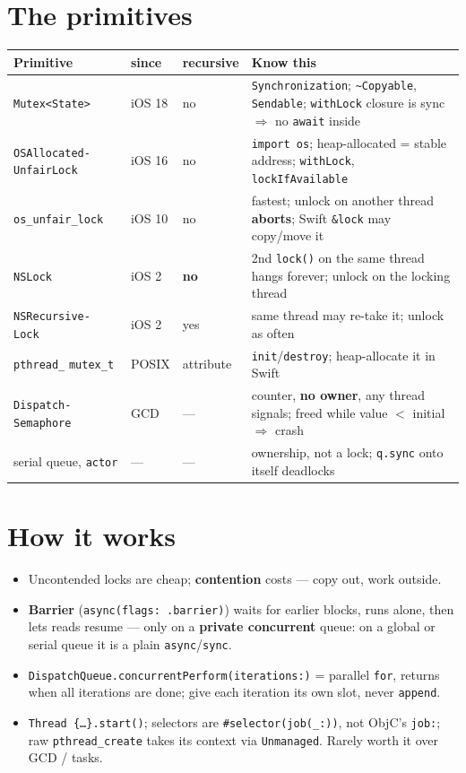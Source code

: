 \documentclass[8pt]{extarticle}
\newcommand\ct[1]{\texttt{#1}}
\begin{document}
\begin{multicols}{2}
\raggedright
\raggedcolumns

\section{The primitives}
{\scriptsize\setlength{\tabcolsep}{2pt}
\begin{tabular}{@{}L{16mm}L{7mm}L{10mm}L{42mm}@{}}
\toprule
\textbf{Primitive} & \textbf{since} & \textbf{recursive} & \textbf{Know this} \\ \midrule
\ct{Mutex<State>} & iOS 18 & no & \ct{Synchronization}; \ct{\textasciitilde Copyable}, \ct{Sendable}; \ct{withLock} closure is sync $\Rightarrow$ no \ct{await} inside \\
\ct{OSAllocated-} \ct{UnfairLock} & iOS 16 & no & \ct{import os}; heap-allocated = stable address; \ct{withLock}, \ct{lockIfAvailable} \\
\ct{os\_unfair\_lock} & iOS 10 & no & fastest; unlock on another thread \textbf{aborts}; Swift \ct{\&lock} may copy/move it \\
\ct{NSLock} & iOS 2 & \textbf{no} & 2nd \ct{lock()} on the same thread hangs forever; unlock on the locking thread \\
\ct{NSRecursive-} \ct{Lock} & iOS 2 & yes & same thread may re-take it; unlock as often \\
\ct{pthread\_} \ct{mutex\_t} & POSIX & attribute & \ct{init}/\ct{destroy}; heap-allocate it in Swift \\
\ct{Dispatch-} \ct{Semaphore} & GCD & — & counter, \textbf{no owner}, any thread signals; freed while value $<$ initial $\Rightarrow$ crash \\
serial queue, \ct{actor} & — & — & ownership, not a lock; \ct{q.sync} onto itself deadlocks \\
\bottomrule
\end{tabular}}

\section{How it works}
\begin{itemize}
  \item Uncontended locks are cheap; \textbf{contention} costs — copy out, work outside.
  \item \textbf{Barrier} (\ct{async(flags: .barrier)}) waits for earlier blocks, runs alone,
        then lets reads resume — only on a \textbf{private concurrent} queue: on a global or
        serial queue it is a plain \ct{async}/\ct{sync}.
  \item \ct{DispatchQueue.concurrentPerform(iterations:)} = parallel \ct{for}, returns when
        all iterations are done; give each iteration its own slot, never \ct{append}.
  \item \ct{Thread \{…\}.start()}; selectors are \ct{\#selector(job(\_:))}, not ObjC's
        \ct{job:}; raw \ct{pthread\_create} takes its context via \ct{Unmanaged}. Rarely
        worth it over GCD / tasks.
\end{itemize}


\end{multicols}
\end{document}
